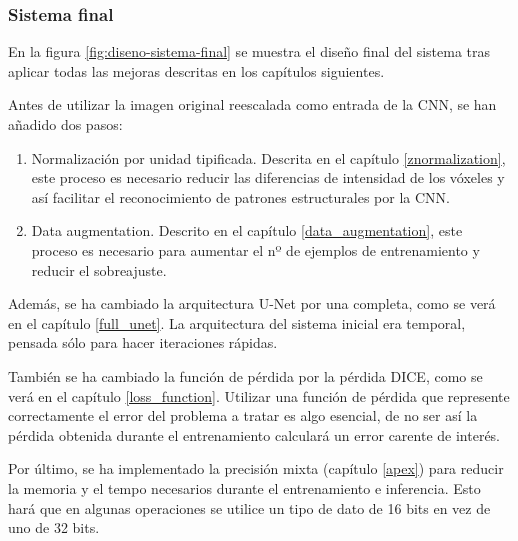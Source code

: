 \subsubsection{Sistema final}

En la figura \ref{fig:diseno-sistema-final} se muestra el diseño final del sistema tras aplicar todas las mejoras descritas en los capítulos siguientes.

Antes de utilizar la imagen original reescalada como entrada de la CNN, se han añadido dos pasos:
\begin{enumerate}
\item Normalización por unidad tipificada. Descrita en el capítulo \ref{znormalization}, este proceso es necesario reducir las diferencias de intensidad de los vóxeles y así facilitar el reconocimiento de patrones estructurales por la CNN. 
\item Data augmentation. Descrito en el capítulo \ref{data_augmentation}, este proceso es necesario para aumentar el nº de ejemplos de entrenamiento y reducir el sobreajuste.
\end{enumerate}

Además, se ha cambiado la arquitectura U-Net por una completa, como se verá en el capítulo \ref{full_unet}. La arquitectura del sistema inicial era temporal, pensada sólo para hacer iteraciones rápidas.

También se ha cambiado la función de pérdida por la pérdida DICE, como se verá en el capítulo \ref{loss_function}. Utilizar una función de pérdida que represente correctamente el error del problema a tratar es algo esencial, de no ser así la pérdida obtenida durante el entrenamiento calculará un error carente de interés.

Por último, se ha implementado la precisión mixta (capítulo \ref{apex}) para reducir la memoria y el tempo necesarios durante el entrenamiento e inferencia. Esto hará que en algunas operaciones se utilice un tipo de dato de 16 bits en vez de uno de 32 bits.